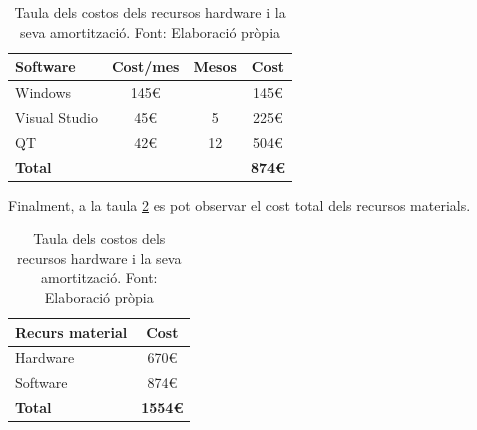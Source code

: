 \documentclass[a4paper]{article}
\begin{document}
\begin{table}[H]
    \begin{center}
        \begin{tabular}{|l|c|c|c|}
            \hline
            \rowcolor[HTML]{9B9B9B} 
            {\color[HTML]{000000} \textbf{Software}} & {\color[HTML]{000000} \textbf{Cost/mes}} & {\color[HTML]{000000} \textbf{Mesos}} & {\color[HTML]{000000} \textbf{Cost}} \\ \hline
            {\color[HTML]{000000} Windows}           & {\color[HTML]{000000} 145€}              & {\color[HTML]{000000} }               & {\color[HTML]{000000} 145€}          \\ \hline
            {\color[HTML]{000000} Visual Studio}     & {\color[HTML]{000000} 45€}               & {\color[HTML]{000000} 5}              & {\color[HTML]{000000} 225€}          \\ \hline
            {\color[HTML]{000000} QT}                & {\color[HTML]{000000} 42€}               & {\color[HTML]{000000} 12}             & {\color[HTML]{000000} 504€}          \\ \hline
            \rowcolor[HTML]{C0C0C0} 
            {\color[HTML]{000000} \textbf{Total}}    & {\color[HTML]{000000} \textbf{}}         & {\color[HTML]{000000} \textbf{}}      & {\color[HTML]{000000} \textbf{874€}} \\ \hline
        \end{tabular}
        \caption[Taula dels costos dels recursos hardware i la seva amortització]{Taula dels costos dels recursos hardware i la seva amortització. Font: Elaboració pròpia}
        \label{tab:TaulaCostosSoftware}
    \end{center}
\end{table}

Finalment, a la taula \ref{tab:TaulaCostosMaterials} es pot observar el cost total dels recursos materials.

\begin{table}[H]
    \begin{center}
        \begin{tabular}{|l|c|}
            \hline
            \rowcolor[HTML]{9B9B9B} 
            {\color[HTML]{000000} \textbf{Recurs material}} & {\color[HTML]{000000} \textbf{Cost}}  \\ \hline
            {\color[HTML]{000000} Hardware}                 & {\color[HTML]{000000} 670€}           \\ \hline
            {\color[HTML]{000000} Software}                 & {\color[HTML]{000000} 874€}           \\ \hline
            \rowcolor[HTML]{C0C0C0} 
            {\color[HTML]{000000} \textbf{Total}}           & {\color[HTML]{000000} \textbf{1554€}} \\ \hline
        \end{tabular}
        \caption[Taula dels costos dels recursos hardware i la seva amortització]{Taula dels costos dels recursos hardware i la seva amortització. Font: Elaboració pròpia}
        \label{tab:TaulaCostosMaterials}
    \end{center}
\end{table}
\end{document}
